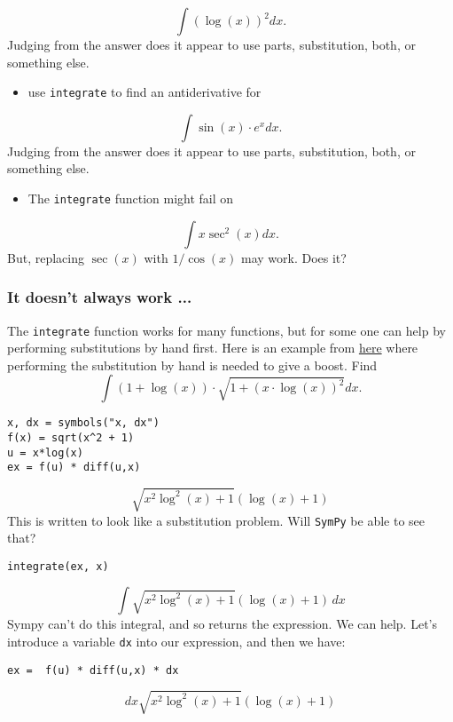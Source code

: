 \documentclass[12pt]{article}
\begin{document}
$$
\int (\log(x))^2 dx.
$$
\newline
Judging from the answer does it appear to use parts, substitution, both, or something else.\begin{itemize}\item use \texttt{integrate} to find an antiderivative for \end{itemize}
$$
\int \sin(x) \cdot e^x dx.
$$
\newline
Judging from the answer does it appear to use parts, substitution, both, or something else.\begin{itemize}\item The \texttt{integrate} function might fail on\end{itemize}
$$
\int x \sec^2(x) dx.
$$
\newline
But, replacing $\sec(x)$ with $1/\cos(x)$ may work. Does it?\subsubsection{It doesn't always work ...}\newline
The \texttt{integrate} function works for many functions, but for some one can help by performing substitutions by hand first.\newline
Here is an example from \href{http://faculty.uml.edu/jpropp/142/Integration.pdf}{here} where performing the substitution by hand is needed to give a boost. Find
$$
\int (1 + \log(x)) \cdot \sqrt{1 + (x\cdot\log(x))^2} dx.
$$
\begin{verbatim}
x, dx = symbols("x, dx")
f(x) = sqrt(x^2 + 1)
u = x*log(x)
ex = f(u) * diff(u,x)
\end{verbatim}
$$\sqrt{x^{2} \log^{2}{\left (x \right )} + 1} \left(\log{\left (x \right )} + 1\right)$$\newline
This is written to look like a substitution problem. Will \texttt{SymPy} be able to see that?\begin{verbatim}
integrate(ex, x)
\end{verbatim}
$$\int \sqrt{x^{2} \log^{2}{\left (x \right )} + 1} \left(\log{\left (x \right )} + 1\right)\, dx$$\newline
Sympy can't do this integral, and so returns the expression. We can help.\newline
Let's introduce a variable \texttt{dx} into our expression, and then we have:\begin{verbatim}
ex =  f(u) * diff(u,x) * dx
\end{verbatim}
$$dx \sqrt{x^{2} \log^{2}{\left (x \right )} + 1} \left(\log{\left (x \right )} + 1\right)$$\newline
\end{document}
